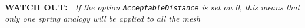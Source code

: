 \documentclass[11pt]{article}
\begin{document}
\begin{figure}[H]
\end{figure}
{\bf WATCH OUT:~} {\it If the option {\tt AcceptableDistance} is set on 0, this means that only one spring analogy will be applied to all the mesh}
\end{document}

